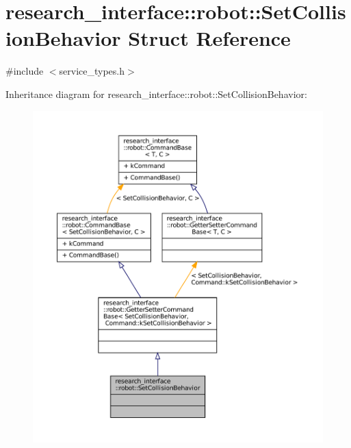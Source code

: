 \hypertarget{structresearch__interface_1_1robot_1_1SetCollisionBehavior}{}\section{research\+\_\+interface\+:\+:robot\+:\+:Set\+Collision\+Behavior Struct Reference}
\label{structresearch__interface_1_1robot_1_1SetCollisionBehavior}


{\ttfamily \#include $<$service\+\_\+types.\+h$>$}



Inheritance diagram for research\+\_\+interface\+:\+:robot\+:\+:Set\+Collision\+Behavior\+:
\nopagebreak
\begin{figure}[H]
\begin{center}
\leavevmode
\includegraphics[width=350pt]{structresearch__interface_1_1robot_1_1SetCollisionBehavior__inherit__graph}
\end{center}
\end{figure}


